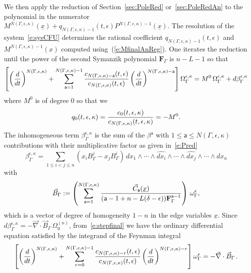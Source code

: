 \documentclass[a4paper,12pt]{article}
\numberwithin{equation}{section}
\numberwithin{figure}{section}
\begin{document}
We then apply the reduction of Section~\ref{sec:PoleRed} or~\ref{sec:PoleRedAn} to
the polynomial in the numerator
$M^{
      N(\Gamma,\epsilon,\kappa)}(\underline x)+q_{N(\Gamma,\epsilon,\kappa)-1}(t,\epsilon)
    P^{N(\Gamma,\epsilon,\kappa)-1}(\underline x)$.
The resolution of the
system~\eqref{e:sysCFU} determines the  rational coefficient
$q_{N(\Gamma,\epsilon,\kappa)-1}(t,\epsilon)$ and
$M^{N(\Gamma,\epsilon,\kappa)-1}(x)$ computed using~(\ref{e:MfinalAnReg}). One
iterates the reduction until the power of  the second Symanzik
polynomial $\textbf{F}_\Gamma$ is $n-L-1$ so
that
\begin{equation}\label{e:stepfinal}
\left[\left(d\over dt\right)^{N(\Gamma,\epsilon,\kappa)}
  +\sum_{\mathsf{a}=1}^{N(\Gamma,\epsilon,\kappa)-1}
  {c_{N(\Gamma,\epsilon,\kappa)-\mathsf{a}}(t,\epsilon)\over c_{N(\Gamma,\epsilon,\kappa)}(t,\epsilon)} \left(d\over dt\right)^{N(\Gamma,\epsilon,\kappa)-\mathsf{a}}\right] \Omega_\Gamma^{\epsilon,\kappa}=M^{0}\,\Omega_\Gamma^{\epsilon,\kappa}+ d\beta_\Gamma^{\epsilon ,\kappa}
\end{equation}
where $M^0$ is of degree 0 so that we
\begin{equation}
  q_0(t,\epsilon,\kappa)=  {c_{0}(t,\epsilon,\kappa)\over
    c_{N(\Gamma,\epsilon,\kappa)}(t,\epsilon,\kappa)}= -M^0  .
\end{equation}
The inhomogeneous term  $\beta_\Gamma^{\epsilon,\kappa} $ is the sum of the
$\beta^{\mathsf{a}}$ with $1\leq
\mathsf{a}\leq N(\Gamma,\epsilon,\kappa)$
contributions with their multiplicative factor as given
in~\eqref{e:Pred}
\begin{equation}
  \label{e:betaGamma}
  \beta_\Gamma^{\epsilon,\kappa}= \sum_{1\leq i<j\leq n} (x_i B^j_\Gamma- x_j B^i_\Gamma) \,
  dx_1\wedge \cdots \wedge \widehat{dx_i}\wedge \cdots \wedge\widehat{dx_j}\wedge
  \cdots \wedge dx_n 
\end{equation}
with
\begin{equation}
  \label{e:BetaGamma}
  \vec B_\Gamma:=\left(\sum_{\mathsf{a}=1}^{N(\Gamma,\epsilon,\kappa)} {
      \vec C_{\mathsf{a}} (\underline x) \over
   ( \mathsf{a}-1+n-L(\delta-\epsilon))\mathbf{F}_\Gamma^{\mathsf{a}-1}}\right) \,\omega_\Gamma^\epsilon ,
\end{equation}
which is a vector of degree of homogeneity $1-n$ in the edge variables
$\underline x$.
Since $d\beta_\Gamma^{\epsilon,\kappa}= -\vec\nabla\cdot \vec B_\Gamma\,
\Omega_0^{(n)}$, from~\eqref{e:stepfinal} we have the ordinary
differential equation satisfied by the integrand of the Feynman
integral
\begin{equation}\label{e:stepfinalode}
\left[\left(d\over dt\right)^{N(\Gamma,\epsilon,\kappa)}
  +\sum_{r=0}^{N(\Gamma,\epsilon,\kappa)-1}
  {c_{N(\Gamma,\epsilon,\kappa)-r}(t,\epsilon)\over c_{N(\Gamma,\epsilon,\kappa)}(t,\epsilon)} \left(d\over dt\right)^{N(\Gamma,\epsilon,\kappa)-r}\right] \omega_\Gamma^\epsilon =-\vec\nabla\cdot \vec B_\Gamma\,.
\end{equation}
\end{document}
